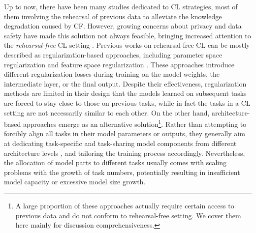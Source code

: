 Up to now, there have been many studies dedicated to CL strategies, most of them involving the rehearsal of previous data to alleviate the knowledge degradation caused by CF. However, growing concerns about privacy and data safety have made this solution not always feasible, bringing increased attention to the \textit{rehearsal-free} CL setting \cite{smith2023closer}.
Previous works on rehearsal-free CL can be mostly described as regularization-based approaches, including parameter space regularization \citep[e.g.][]{kirkpatrick2017overcoming, zenke2017continual} and feature space regularization \citep[e.g.][]{li2017learning, rebuffi2017icarl}.
These approaches introduce different regularization losses during training on the model weights, the intermediate layer, or the final output.
Despite their effectiveness, regularization methods are limited in their design that the models learned on subsequent tasks are forced to stay close to those on previous tasks, while in fact the tasks in a CL setting are not necessarily similar to each other. On the other hand, architecture-based approaches \citep{wang2024comprehensive} emerge as an alternative solution\footnote{A large proportion of these approaches actually require certain access to previous data and do not conform to rehearsal-free setting. We cover them here mainly for discussion comprehensiveness.}. Rather than attempting to forcibly align all tasks in their model parameters or outputs, they generally aim at dedicating task-specific and task-sharing model components from different architecture levels \citep[e.g.][]{mallya2018packnet, wortsman2020supermasks, jin2022helpful}, and tailoring the training process accordingly. Nevertheless, the allocation of model parts to different tasks usually comes with scaling problems with the growth of task numbers, potentially resulting in insufficient model capacity or excessive model size growth.

